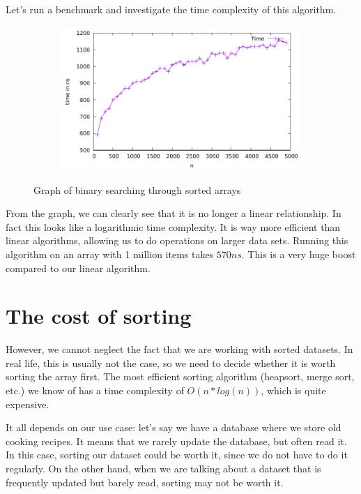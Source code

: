 \documentclass[a4paper,11pt]{article}
\begin{document}
    Let's run a benchmark and investigate the time complexity of this algorithm.

    \begin{figure}[h]
        \centering
        \begin{subfigure}[b]{.5\textwidth}
            \centering
            \includegraphics[width=\textwidth]{./binary_search/data} %
        \end{subfigure}
        \caption{Graph of binary searching through sorted arrays}
        \label{fig:graph_3}
    \end{figure}
    From the graph, we can clearly see that it is no longer a linear relationship.
    In fact this looks like a logarithmic time complexity.
    It is way more efficient than linear algorithms, allowing us to do operations on larger data sets.
    Running this algorithm on an array with 1 million items takes $570 ns$.
    This is a very huge boost compared to our linear algorithm.

    \section*{The cost of sorting}

    However, we cannot neglect the fact that we are working with sorted datasets.
    In real life, this is usually not the case, so we need to decide whether it is worth sorting the array first.
    The most efficient sorting algorithm (heapsort, merge sort, etc.) we know of has a time complexity of $O(n*log(n))$, which is quite expensive.

    It all depends on our use case: let's say we have a database where we store old cooking recipes.
    It means that we rarely update the database, but often read it.
    In this case, sorting our dataset could be worth it, since we do not have to do it regularly.
    On the other hand, when we are talking about a dataset that is frequently updated but barely read, sorting may not be worth it.
\end{document}
